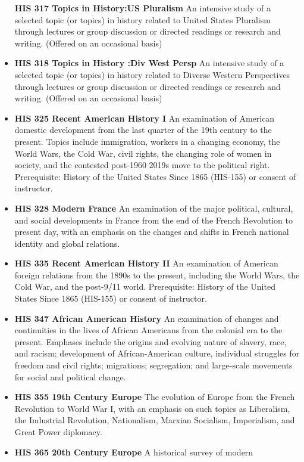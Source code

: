 \documentclass[
  letterpaper,
]{scrbook}
\begin{document}
\begin{itemize}
  \textbf{HIS 317 Topics in History:US Pluralism} An intensive study of
  a selected topic (or topics) in history related to United States
  Pluralism through lectures or group discussion or directed readings or
  research and writing. (Offered on an occasional basis)
\item
  \textbf{HIS 318 Topics in History :Div West Persp} An intensive study
  of a selected topic (or topics) in history related to Diverse Western
  Perspectives through lectures or group discussion or directed readings
  or research and writing. (Offered on an occasional basis)
\item
  \textbf{HIS 325 Recent American History I} An examination of American
  domestic development from the last quarter of the 19th century to the
  present. Topics include immigration, workers in a changing economy,
  the World Wars, the Cold War, civil rights, the changing role of women
  in society, and the contested post-1960 2019s move to the political
  right. Prerequisite: History of the United States Since 1865 (HIS-155)
  or consent of instructor.
\item
  \textbf{HIS 328 Modern France} An examination of the major political,
  cultural, and social developments in France from the end of the French
  Revolution to present day, with an emphasis on the changes and shifts
  in French national identity and global relations.
\item
  \textbf{HIS 335 Recent American History II} An examination of American
  foreign relations from the 1890s to the present, including the World
  Wars, the Cold War, and the post-9/11 world. Prerequisite: History of
  the United States Since 1865 (HIS-155) or consent of instructor.
\item
  \textbf{HIS 347 African American History} An examination of changes
  and continuities in the lives of African Americans from the colonial
  era to the present. Emphases include the origins and evolving nature
  of slavery, race, and racism; development of African-American culture,
  individual struggles for freedom and civil rights; migrations;
  segregation; and large-scale movements for social and political
  change.
\item
  \textbf{HIS 355 19th Century Europe} The evolution of Europe from the
  French Revolution to World War I, with an emphasis on such topics as
  Liberalism, the Industrial Revolution, Nationalism, Marxian Socialism,
  Imperialism, and Great Power diplomacy.
\item
  \textbf{HIS 365 20th Century Europe} A historical survey of modern

\end{itemize}
\end{document}
